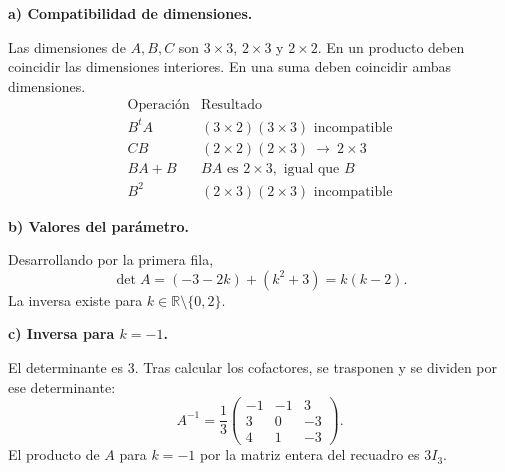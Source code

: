 \textbf{a) Compatibilidad de dimensiones.}\par\nopagebreak[4]
Las dimensiones de $A,B,C$ son $3\times3$, $2\times3$ y $2\times2$. En un producto deben coincidir las dimensiones interiores. En una suma deben coincidir ambas dimensiones.
\[
\begin{array}{c|l}
\text{Operación}&\text{Resultado}\\\hline
B^tA&(3\times2)(3\times3)\text{ incompatible}\\
CB&(2\times2)(2\times3)\ \longrightarrow\ 2\times3\\
BA+B&BA\text{ es }2\times3,\text{ igual que }B\\
B^2&(2\times3)(2\times3)\text{ incompatible}
\end{array}
\]

\textbf{b) Valores del parámetro.}\par\nopagebreak[4]
Desarrollando por la primera fila,
\[
\det A=(-3-2k)+(k^2+3)=k(k-2).
\]
La inversa existe para $\boxed{k\in\mathbb R\setminus\{0,2\}}$.

\textbf{c) Inversa para $k=-1$.}\par\nopagebreak[4]
El determinante es $3$. Tras calcular los cofactores, se trasponen y se dividen por ese determinante:
\[
\boxed{A^{-1}=\frac13\begin{pmatrix}-1&-1&3\\3&0&-3\\4&1&-3\end{pmatrix}.}
\]
El producto de $A$ para $k=-1$ por la matriz entera del recuadro es $3I_3$.
